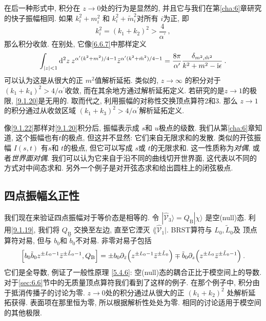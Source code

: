在后一种形式中, 积分在 $z \rightarrow 0$处的行为是显然的, 并且它与我们在第\ref{cha:6}章研究的快子振幅相同. 
如果 $k_{i}^{2}+m_{i}^{2}$ 和 $k_{i}^{2}+\tilde{m}_{i}^{2}$对所有 $i$为正, 即
\begin{equation}
	k_{i}^{2}=\left(k_{1}+k_{2}\right)^{2}>\frac{4}{\alpha^{\prime}} \:, \label{9.1.21}
\end{equation}
那么积分收敛. 在别处, 它像\eqref{6.6.7}中那样定义
\begin{equation}
	\int_{|z|<1} \mathrm{d}^{2} z \: z^{\alpha^{\prime}(k^{2}+m^{2})/4 - 1} \bar{z}^{\alpha^{\prime}(k^{2}+\tilde{m}^{2})/4 - 1}
	 =\frac{8 \pi}{\alpha^{\prime}} \frac{\delta_{m^{2}, \tilde{m}^{2}}}{k^{2} + m^{2} - \mathrm{i} \epsilon} \:. \label{9.1.22}
\end{equation}
可以认为这是从很大的正 $m^{2}$值解析延拓. 类似的, $z \rightarrow \infty$ 的积分对于$(k_{1}+k_{4})^{2}>4 / \alpha^{\prime}$收敛, 
而在其余地方通过解析延拓定义. 若研究的是$z \rightarrow 1$的极限, \eqref{9.1.20}是无用的. 取而代之, 利用振幅的对称性交换顶点算符2和3. 
那么 $z \rightarrow 1$ 的积分通过从收敛区域 $(k_{1}+k_{3})^{2}>4 / \alpha^{\prime} $解析延拓定义.

像\eqref{9.1.22}那样对\eqref{9.1.20}积分后, 振幅表示成 $s$和 $u$极点的级数. 我们从第\ref{cha:6}章知道, 这个振幅也有$t$的极点, 但这并不显然: 
它们来自无限求和的发散. 类似的开弦振幅 $I(s, t)$ 有$s$和 $t$的极点, 但它可以写成 $s$或 $t$的无限求和. 
这一性质称为\emph{对偶}, 或者\emph{世界面对偶}. 我们可以认为它来自于沿不同的曲线切开世界面, 这代表以不同的方式对中间态求和. 
另外一个例子是对开弦态求和给出圆柱上的闭弦极点.

\subsection*{四点振幅幺正性}

我们现在来验证四点振幅对于等价态是相等的. 令 $|\hat{\mathscr{V}}_{3}\rangle=Q_{\mathrm{B}}|\chi\rangle$ 是空(null)态. 
利用\eqref{9.1.19}, 我们将 $Q_{\mathrm{B}}$ 交换至左边, 直至它湮灭 $\lAngle\hat{\mathscr{V}}_{1}|$. 
BRST算符与 $L_{0}, \tilde{L}_{0}$及 顶点算符对易, 但与 $b_{0}$和 $\tilde{b}_{0}$不对易. 非零对易子包括
\begin{equation}
	\Bigl[b_{0} \tilde{b}_{0} z^{\pm L_{0}-1} \bar{z}^{\pm \tilde{L}_{0}-1}, Q_{\mathrm{B}}\Bigr] = 
	\pm b_{0} \partial_{\bar{z}}\Bigl(z^{\pm L_{0}-1} \bar{z}^{\pm \tilde{L}_{0}}\Bigr) \mp 
	\tilde{b}_{0} \partial_{z}\Bigl(z^{\pm L_{0}} \bar{z}^{\pm \tilde{L}_{0}-1}\Bigr) \:. \label{9.1.23}
\end{equation}
它们是全导数, 例证了一般性原理 \eqref{5.4.6}: 空(null)态的耦合正比于模空间上的导数. 对于\ref{sec:6.6}节中的无质量顶点算符我们看到了这样的例子. 
在那个例子中, 积分由于抵消传播子的讨论为零. $z \rightarrow 0$处的积分通过从很大的正 $(k_{1} + k_{2})^{2}$ 处解析延拓获得. 
表面项在那里恒为零, 所以根据解析性处处为零. 相同的讨论适用于模空间的其他极限.

